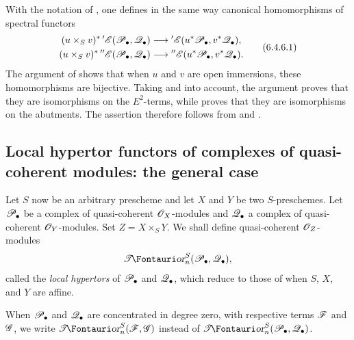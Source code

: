 \begin{env}[6.4.6]
\label{III.6.4.6}
With the notation of , one defines in the same way
canonical homomorphisms of spectral functors
\[
  \begin{aligned}
  (u\times_Sv)^*\,{}'\sh E(\sh P_\bullet,\sh Q_\bullet)
  &\longrightarrow
  {}'\sh E(u^*\sh P_\bullet,v^*\sh Q_\bullet),\\
  (u\times_Sv)^*\,{}''\sh E(\sh P_\bullet,\sh Q_\bullet)
  &\longrightarrow
  {}''\sh E(u^*\sh P_\bullet,v^*\sh Q_\bullet).
  \end{aligned}
  \tag{6.4.6.1}\label{III.6.4.6.1}
\]
The argument of  shows that when $u$ and $v$ are
open immersions, these homomorphisms are bijective.  Taking
 and  into account, the
argument proves that they are isomorphisms on the $E^2$-terms,
while  proves that they are isomorphisms on the
abutments.  The assertion therefore follows from
 and .
\end{env}


\subsection{Local hypertor functors of complexes of quasi-coherent modules: the general case}
\label{subsection:III.6.5}

\begin{env}[6.5.1]
\label{III.6.5.1}
Let $S$ now be an arbitrary prescheme and let $X$ and $Y$ be two
$S$-preschemes.  Let $\mathscr{P}_\bullet$ be a complex of quasi-coherent
$\mathscr{O}_X$-modules and $\mathscr{Q}_\bullet$ a complex of quasi-coherent
$\mathscr{O}_Y$-modules.  Set $Z=X\times_SY$.  We shall define
quasi-coherent $\mathscr{O}_Z$-modules
\[
  \shTor_n^S(\sh P_\bullet,\sh Q_\bullet),
\]
called the \emph{local hypertors} of $\mathscr{P}_\bullet$ and
$\mathscr{Q}_\bullet$, which reduce to those of  when
$S$, $X$, and $Y$ are affine.

When $\mathscr{P}_\bullet$ and $\mathscr{Q}_\bullet$ are concentrated in
degree zero, with respective terms $\mathscr{F}$ and $\mathscr{G}$, we write
$\shTor_n^S(\sh F,\sh G)$ instead of
$\shTor_n^S(\sh P_\bullet,\sh Q_\bullet)$.
\end{env}

